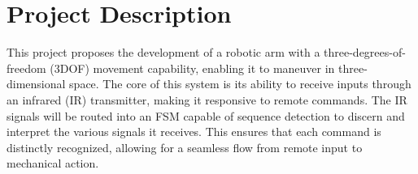 \documentclass[
    a4paper, %
	12pt, %
    ]{CSSullivanBusinessReport}
\begin{document}


\bigskip
\begin{twothirdswidth} %
	\tableofcontents %
\end{twothirdswidth}

\newpage


\section{Project Description} %

This project proposes the development of a robotic arm with a three-degrees-of-freedom (3DOF) movement capability, enabling it to maneuver in three-dimensional space. The core of this system is its ability to receive inputs through an infrared (IR) transmitter, making it responsive to remote commands. The IR signals will be routed into an FSM capable of sequence detection to discern and interpret the various signals it receives. This ensures that each command is distinctly recognized, allowing for a seamless flow from remote input to mechanical action.
\end{document}
